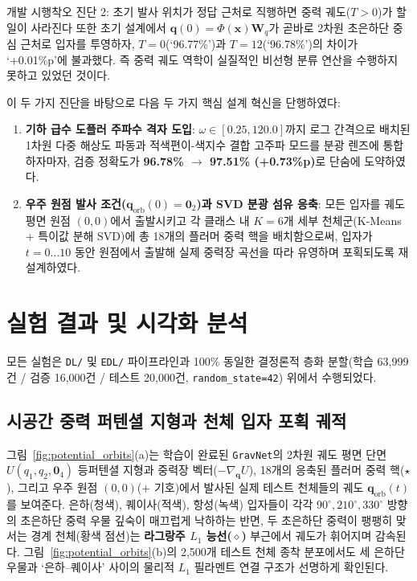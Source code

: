 \documentclass[11pt,a4paper]{article}
\begin{document}
\begin{cautionbox}{개발 시행착오 진단 2: 초기 발사 위치가 정답 근처로 직행하면 중력 궤도($T>0$)가 할 일이 사라진다}
또한 초기 설계에서 $\mathbf{q}(0) = \Phi(\mathbf{x})\mathbf{W}_q$가 곧바로 2차원 초은하단 중심 근처로 입자를 투영하자, $T=0$(`96.77\%')과 $T=12$(`96.78\%')의 차이가 `+0.01\%p'에 불과했다. 즉 중력 궤도 역학이 실질적인 비선형 분류 연산을 수행하지 못하고 있었던 것이다.
\end{cautionbox}

이 두 가지 진단을 바탕으로 다음 두 가지 핵심 설계 혁신을 단행하였다:
\begin{enumerate}[leftmargin=18pt, itemsep=2pt]
  \item \textbf{기하 급수 도플러 주파수 격자 도입}: $\omega \in [0.25, 120.0]$까지 로그 간격으로 배치된 1차원 다중 해상도 파동과 적색편이-색지수 결합 고주파 모드를 분광 렌즈에 통합하자마자, 검증 정확도가 \textbf{96.78\% $\rightarrow$ 97.51\% (+0.73\%p)}로 단숨에 도약하였다.
  \item \textbf{우주 원점 발사 조건($\mathbf{q}_{\text{orb}}(0) = \mathbf{0}_2$)과 SVD 분광 섬유 응축}: 모든 입자를 궤도 평면 원점 $(0,0)$에서 출발시키고 각 클래스 내 $K=6$개 세부 천체군(K-Means + 특이값 분해 SVD)에 총 18개의 플러머 중력 핵을 배치함으로써, 입자가 $t=0 \dots 10$ 동안 원점에서 출발해 실제 중력장 곡선을 따라 유영하며 포획되도록 재설계하였다.
\end{enumerate}

\section{실험 결과 및 시각화 분석}

모든 실험은 \texttt{DL/} 및 \texttt{EDL/} 파이프라인과 100\% 동일한 결정론적 층화 분할(학습 63,999건 / 검증 16,000건 / 테스트 20,000건, \texttt{random\_state=42}) 위에서 수행되었다.

\subsection{시공간 중력 퍼텐셜 지형과 천체 입자 포획 궤적}

그림~\ref{fig:potential_orbits}(a)는 학습이 완료된 \texttt{GravNet}의 2차원 궤도 평면 단면 $U(q_1, q_2, \mathbf{0}_4)$ 등퍼텐셜 지형과 중력장 벡터($-\nabla_{\mathbf{q}} U$), 18개의 응축된 플러머 중력 핵($\star$), 그리고 우주 원점 $(0,0)$($+$ 기호)에서 발사된 실제 테스트 천체들의 궤도 $\mathbf{q}_{\text{orb}}(t)$를 보여준다. 은하(청색), 퀘이사(적색), 항성(녹색) 입자들이 각각 $90^\circ, 210^\circ, 330^\circ$ 방향의 초은하단 중력 우물 깊숙이 매끄럽게 낙하하는 반면, 두 초은하단 중력이 팽팽히 맞서는 경계 천체(황색 점선)는 \textbf{라그랑주 $L_1$ 능선($\diamond$)} 부근에서 궤도가 휘어지며 감속된다. 그림~\ref{fig:potential_orbits}(b)의 2,500개 테스트 천체 종착 분포에서도 세 은하단 우물과 `은하--퀘이사' 사이의 물리적 $L_1$ 필라멘트 연결 구조가 선명하게 확인된다.
\end{document}

